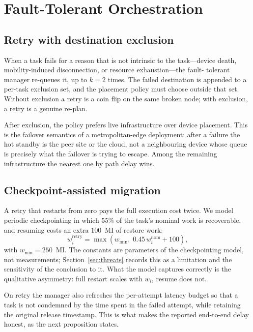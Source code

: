 \documentclass[journal,10pt]{IEEEtran}
\begin{document}
\section{Fault-Tolerant Orchestration}
\label{sec:ft}

\subsection{Retry with destination exclusion}
When a task fails for a reason that is not intrinsic to the task---device
death, mobility-induced disconnection, or resource exhaustion---the fault-
tolerant manager re-queues it, up to $k=2$ times. The failed destination is
appended to a per-task exclusion set, and the placement policy must choose
outside that set. Without exclusion a retry is a coin flip on the same broken
node; with exclusion, a retry is a genuine re-plan.

After exclusion, the policy prefers live infrastructure over device placement.
This is the failover semantics of a metropolitan-edge deployment: after a
failure the hot standby is the peer site or the cloud, not a neighbouring
device whose queue is precisely what the failover is trying to escape. Among
the remaining infrastructure the nearest one by path delay wins.

\subsection{Checkpoint-assisted migration}
A retry that restarts from zero pays the full execution cost twice. We model
periodic checkpointing in which $55\%$ of the task's nominal work is recoverable,
and resuming costs an extra $100$~MI of restore work:
\begin{equation}
w_i^{\text{retry}}=\max\!\left(w_{\min},\;0.45\,w_i^{\text{nom}}+100\right),
\label{eq:retry}
\end{equation}
with $w_{\min}=250$~MI. The constants are parameters of the checkpointing
model, not measurements; Section~\ref{sec:threats} records this as a limitation
and the sensitivity of the conclusion to it. What the model captures correctly
is the qualitative asymmetry: full restart scales with $w_i$, resume does not.

On retry the manager also refreshes the per-attempt latency budget so that a
task is not condemned by the time spent in the failed attempt, while retaining
the original release timestamp. This is what makes the reported end-to-end
delay honest, as the next proposition states.
\end{document}

